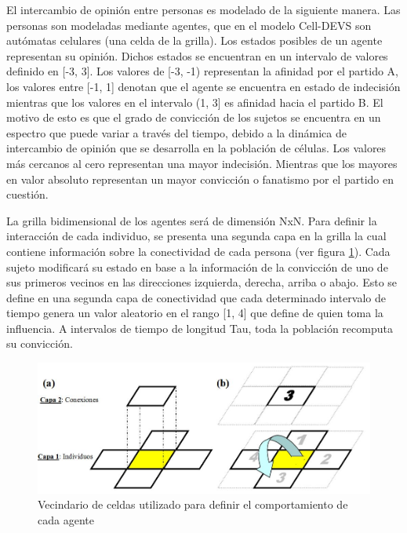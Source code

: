 El intercambio de opinión entre personas es modelado de la siguiente manera. Las personas son modeladas mediante agentes, que en el modelo Cell-DEVS son autómatas celulares (una celda de la grilla).
Los estados posibles de un agente representan su opinión. Dichos estados se encuentran en un intervalo de valores definido en [-3, 3]. Los valores de [-3, -1)  representan la afinidad por el partido A, los valores entre [-1, 1] denotan que el agente se encuentra en estado de indecisión mientras que los valores en el intervalo (1, 3] es afinidad hacia el partido B.
El motivo de esto es que el grado de convicción de los sujetos se encuentra en un espectro que puede variar a través del tiempo, debido a la dinámica de intercambio de opinión que se desarrolla en la población de células. Los valores más cercanos al cero representan una mayor indecisión. Mientras que los mayores en valor absoluto representan un mayor convicción o fanatismo por el partido en cuestión.

La grilla bidimensional de los agentes será de dimensión NxN. Para definir la interacción de cada individuo, se presenta una segunda capa en la grilla la cual contiene información sobre la conectividad de cada persona (ver figura \ref{fig:modelo_pina}). Cada sujeto modificará su estado en base a la información de la convicción de uno de sus primeros vecinos en las direcciones izquierda, derecha, arriba o abajo. Esto se define en una segunda capa de conectividad que cada determinado intervalo de tiempo genera un valor aleatorio en el rango [1, 4] que define de quien toma la influencia. A intervalos de tiempo de longitud Tau, toda la población recomputa su convicción.

\begin{figure}[!h]
\centering
\includegraphics[scale=0.5]{imagenes/modelo_pina.png}
\caption{Vecindario de celdas utilizado para definir el comportamiento de cada agente}
\label{fig:modelo_pina}
\end{figure}

